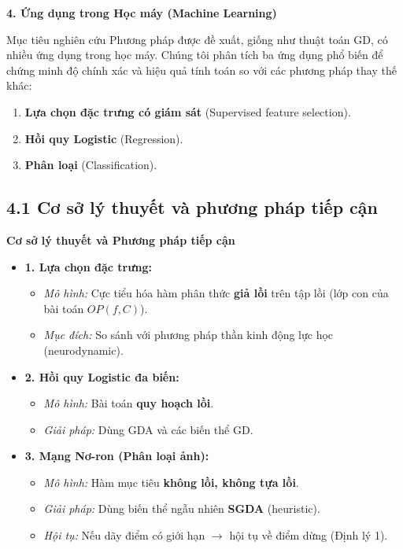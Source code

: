 \begin{frame}[t]{\textbf{\large 4. Ứng dụng trong Học máy (Machine Learning)}}\vspace*{-1cm}	\begin{block}{Mục tiêu nghiên cứu}
		Phương pháp được đề xuất, giống như thuật toán GD, có nhiều ứng dụng trong học máy. Chúng tôi phân tích ba ứng dụng phổ biến để chứng minh độ chính xác và hiệu quả tính toán so với các phương pháp thay thế khác:
	\end{block}
	
	\vspace{0.5cm}
	\begin{enumerate}
		\item \textbf{Lựa chọn đặc trưng có giám sát} (Supervised feature selection).
		\item \textbf{Hồi quy Logistic} (Regression).
		\item \textbf{Phân loại} (Classification).
	\end{enumerate}
\end{frame}

\subsection{4.1 Cơ sở lý thuyết và phương pháp tiếp cận}
\begin{frame}[t]{\textbf{\large Cơ sở lý thuyết và Phương pháp tiếp cận}}\vspace*{-0.5cm}	\begin{itemize}
		\item \textbf{1. Lựa chọn đặc trưng:} 
		\begin{itemize}
			\item \textit{Mô hình:} Cực tiểu hóa hàm phân thức \textbf{giả lồi} trên tập lồi (lớp con của bài toán $OP(f, C)$).
			\item \textit{Mục đích:} So sánh với phương pháp thần kinh động lực học (neurodynamic).
		\end{itemize}
		\vspace{0.3cm}
		
		\item \textbf{2. Hồi quy Logistic đa biến:}
		\begin{itemize}
			\item \textit{Mô hình:} Bài toán \textbf{quy hoạch lồi}.
			\item \textit{Giải pháp:} Dùng GDA và các biến thể GD.
		\end{itemize}
		\vspace{0.3cm}
		
		\item \textbf{3. Mạng Nơ-ron (Phân loại ảnh):}
		\begin{itemize}
			\item \textit{Mô hình:} Hàm mục tiêu \textbf{không lồi, không tựa lồi}.
			\item \textit{Giải pháp:} Dùng biến thể ngẫu nhiên \textbf{SGDA} (heuristic).
			\item \textit{Hội tụ:} Nếu dãy điểm có giới hạn $\rightarrow$ hội tụ về điểm dừng (Định lý 1).
		\end{itemize}
	\end{itemize}
\end{frame}

